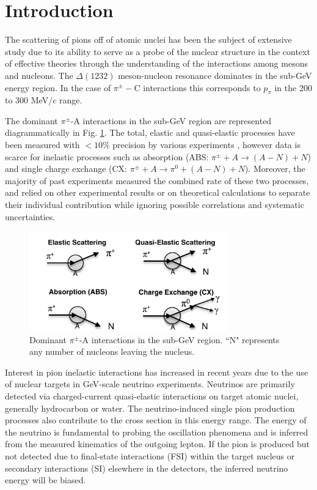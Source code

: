\section{\label{sec:intro}Introduction\protect}
The scattering of pions off of atomic nuclei has been the subject of extensive study
due to its ability to serve as a probe of the nuclear structure in the context of effective theories through the understanding of the interactions among mesons and nucleons. The $\Delta(1232)$ meson-nucleon resonance dominates in the sub-GeV energy region. In the case of $\pi^{\pm}-$C interactions this corresponds to $p_{\pi}$ in the 200 to 300 MeV$/c$ range.

The dominant $\pi^{\pm}$-A interactions in the sub-GeV region are represented diagrammatically in Fig. \ref{fig:interactions}. The total, elastic and quasi-elastic processes have been measured with $<10\%$ precision by various experiments \cite{Allardyce,Binon,Saunders,Gelderloos,Levenson,Ashery2,Ingram,Jones,Ashery,Bellotti1973,Bellotti1973_2}, however data is scarce for inelastic processes such as absorption (ABS: $\pi^{\pm}+A\rightarrow (A-N) + N$) and single charge exchange (CX: $\pi^{\pm} + A \rightarrow \pi^{0}+ (A-N) + N$). Moreover, the majority of past experiments measured the combined rate of these two processes, and relied on other experimental results or on theoretical calculations to separate their individual contribution while ignoring possible correlations and systematic uncertainties.

\begin{figure}[ht]
\includegraphics[width=86mm]{figures/Figure1_sep_paper_b_w.pdf}
\caption{Dominant $\pi^{\pm}$-A interactions in the sub-GeV region. ``N" represents any number of nucleons leaving the nucleus.}
\label{fig:interactions}
\end{figure}

Interest in pion inelastic interactions has increased in recent years due to the use of nuclear targets in GeV-scale neutrino experiments. Neutrinos are primarily detected via charged-current quasi-elastic interactions on target atomic nuclei, generally hydrocarbon or water. The neutrino-induced single pion production processes also contribute to the cross section in this energy range. The energy of the neutrino is fundamental to probing the oscillation phenomena and is inferred from the measured kinematics of the outgoing lepton.  If the pion is produced but not detected due to final-state interactions (FSI) within the target nucleus or secondary interactions (SI) elsewhere in the detectors, the inferred neutrino energy will be biased. 

